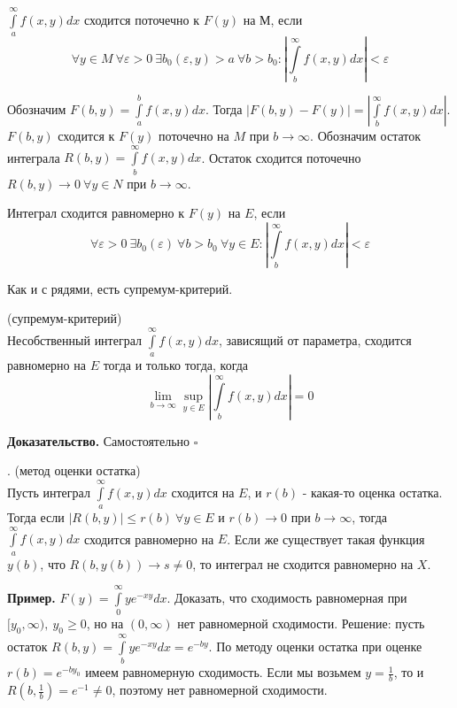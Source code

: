 \begin{defin}
$\int\limits_{a}^{\infty}f(x,y)dx$ сходится поточечно к $F(y)$ на М, если
$$\forall y\in M~\forall \varepsilon>0~\exists b_0(\varepsilon,y)>a~
\forall b>b_0:\left| \int\limits_{b}^{\infty}f(x,y)dx\right|<\varepsilon$$
\end{defin}
Обозначим $F(b,y)=\int\limits_{a}^{b}f(x,y)dx$. Тогда $|F(b,y)-F(y)|=
\left| \int\limits_{b}^{\infty} f(x,y)dx \right|$. $F(b,y)$ сходится к $F(y)$
поточечно на  $M$ при  $b\to \infty$. Обозначим остаток интеграла
$R(b,y)=\int\limits_{b}^{\infty}f(x,y)dx$. Остаток сходится поточечно 
$R(b,y)\to 0~\forall y\in N$ при $b\to \infty$. 
\begin{defin}
Интеграл сходится равномерно к $F(y)$ на  $E$, если
$$\forall \varepsilon>0~\exists b_0(\varepsilon)~\forall b>b_0~\forall y\in E:
\left| \int\limits_{b}^{\infty}f(x,y)dx\right|<\varepsilon$$
\end{defin}
Как и с рядями, есть супремум-критерий.
\begin{theor}
    (супремум-критерий)\\
    Несобственный интеграл $\int\limits_{a}^{\infty} f(x,y)dx$, зависящий от
    параметра, сходится равномерно на $E$ тогда и только тогда, когда
    $$\lim\limits_{b\to \infty}\sup\limits_{y\in  E}\left| 
    \int\limits_{b}^{\infty}f(x,y)dx \right|=0$$
\end{theor}
\textbf{Доказательство.}  Самостоятельно
$\square$ \\
\begin{theor}.
    (метод оценки остатка)\\
Пусть интеграл $\int\limits_{a}^{\infty} f(x,y)dx$ сходится на $E$, и 
$r(b)$ - какая-то оценка остатка. Тогда если
 $|R(b,y)|\leqslant r(b)~\forall y\in E$ и $r(b)\to 0$ при  $b\to \infty$,
 тогда $\int\limits_{a}^{\infty}f(x,y)dx$ сходится равномерно на 
 $E$. Если же существует такая функция  $y(b)$, что $R(b,y(b))\to s\ne 0$,
 то интеграл не сходится равномерно на $X$.
\end{theor}

\textbf{Пример.} $F(y)=\int\limits_{0}^{\infty}ye^{-xy}dx$. Доказать, что 
сходимость равномерная при $[y_0,\infty),~y_0\geqslant0$, но на 
$(0,\infty)$ нет равномерной сходимости. Решение: пусть остаток
$R(b,y)=\int\limits_{b}^{\infty}ye^{-xy}dx=e^{-by}$. По методу оценки
остатка при оценке $r(b)=e^{-by_0}$ имеем равномерную сходимость.
Если мы возьмем $y=\frac{1}{b}$, то и $R(b,\frac{1}{b})=e^{-1}\ne0$, поэтому
нет равномерной сходимости. 



